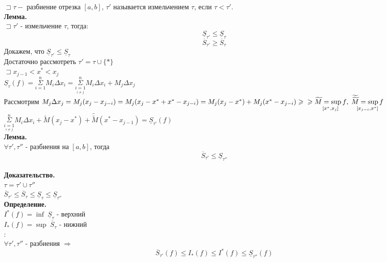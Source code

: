 \documentclass[14pt]{article}
\begin{document}
	$\sqsupset \tau -$ разбиение отрезка $[a,b]$, $\tau'$ называется измельчением $\tau$, если $\tau < \tau'$. \\
	\textbf{Лемма.} \\
	$\sqsupset \tau'$ - измельчение $\tau$, тогда: \\
	$$\boxed{\underline{S}_{\tau'}\leqslant \underline{S}_{\tau}}$$
	$$\boxed{\overline{S}_{\tau'} \geqslant \overline{S}_{\tau}}
	$$
	Докажем, что $\underline{S}_{\tau'} \leqslant \underline{S}_{\tau}$ \\
	Достаточно рассмотреть $\tau' = \tau \cup \{ *\}$ \\
	$\sqsupset x_{j-1}<x^*<x_j$	\\
	$\underline{S}_{\tau}(f)=\underset{i=1}{\overset{n}{\Sigma}}M_i\Delta x_i = \underset{\underset{i \neq j}{i=1}}{\overset{n}{\Sigma}}M_i\Delta x_i + M_j \Delta x_j$ \fbox{$\geqslant$} \\
	Рассмотрим $M_j \Delta x_j = M_j(x_j-x_{j-i}) = M_j(x_j - x^* + x^* - x_{j-i}) = M_j(x_j-x^*)+M_j(x^*-x_{j-i}) \geqslant\\
	\geqslant \underset{[x^*,x_j]}{\widetilde{M}=\sup f}, \; \underset{[x_{j-i},x^*]}{\widetilde{\widetilde{M}}=\sup f}$\\
	\fbox{$\geqslant$} $\underset{\underset{i \neq j}{i=1}}{\overset{n}{\Sigma}}M_i\Delta x_i+\widetilde{M}(x_j-x^*)+\widetilde{\widetilde{M}}(x^*-x_{j-1})=\underline{S}_{\tau'}(f)$ \\
	\textbf{Лемма.} \\
	$\forall \tau',\tau''$ - разбиения на $[a,b]$, тогда \\
	$$\boxed{\overline{S}_{\tau'}\leqslant\underline{S}_{\tau''}}$$ \\
	\textbf{Доказательство.} \\
	$\tau = \tau'\cup \tau''$ \\
	$\overline{S}_{\tau'}\leqslant \overline{S}_{\tau}\leqslant\underline{S}_{\tau}\leqslant\underline{S}_{\tau''}$ \\
	\textbf{Определение.} \\
	$I^*(f)=\inf \; \underline{S}_{\tau}$ - верхний \\
	$I_{*}(f)=\sup \; \overline{S}_{\tau}$ - нижний \\
	 :\\
	$\forall \tau',\tau''$ - разбиения $\Rightarrow $\\
	$$\boxed{\overline{S}_{\tau'}(f) \leqslant I_{*}(f)\leqslant I^*(f)\leqslant \underline{S}_{\tau''}(f)}$$ \\
\end{document}
